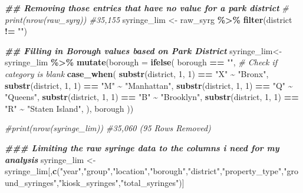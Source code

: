 \documentclass[
]{article}
\newenvironment{Shaded}{\begin{snugshade}}{\end{snugshade}}
\newcommand{\AttributeTok}[1]{\textcolor[rgb]{0.13,0.29,0.53}{#1}}
\newcommand{\CommentTok}[1]{\textcolor[rgb]{0.56,0.35,0.01}{\textit{#1}}}
\newcommand{\DecValTok}[1]{\textcolor[rgb]{0.00,0.00,0.81}{#1}}
\newcommand{\DocumentationTok}[1]{\textcolor[rgb]{0.56,0.35,0.01}{\textbf{\textit{#1}}}}
\newcommand{\FunctionTok}[1]{\textcolor[rgb]{0.13,0.29,0.53}{\textbf{#1}}}
\newcommand{\NormalTok}[1]{#1}
\newcommand{\OtherTok}[1]{\textcolor[rgb]{0.56,0.35,0.01}{#1}}
\newcommand{\SpecialCharTok}[1]{\textcolor[rgb]{0.81,0.36,0.00}{\textbf{#1}}}
\newcommand{\StringTok}[1]{\textcolor[rgb]{0.31,0.60,0.02}{#1}}
\begin{document}
\begin{Shaded}
\begin{Highlighting}[]
\DocumentationTok{\#\# Removing those entries that have no value for a park district }
\CommentTok{\# print(nrow(raw\_syrg)) \#35,155}
\NormalTok{syringe\_lim }\OtherTok{\textless{}{-}}\NormalTok{ raw\_syrg }\SpecialCharTok{\%\textgreater{}\%} \FunctionTok{filter}\NormalTok{(district }\SpecialCharTok{!=} \StringTok{""}\NormalTok{) }

\DocumentationTok{\#\# Filling in Borough values based on Park District}
\NormalTok{syringe\_lim}\OtherTok{\textless{}{-}}\NormalTok{ syringe\_lim }\SpecialCharTok{\%\textgreater{}\%}
 \FunctionTok{mutate}\NormalTok{(}\AttributeTok{borough =} \FunctionTok{ifelse}\NormalTok{(}
\NormalTok{    borough }\SpecialCharTok{==} \StringTok{""}\NormalTok{,  }\CommentTok{\# Check if \textasciigrave{}category\textasciigrave{} is blank}
    \FunctionTok{case\_when}\NormalTok{(}
      \FunctionTok{substr}\NormalTok{(district, }\DecValTok{1}\NormalTok{, }\DecValTok{1}\NormalTok{) }\SpecialCharTok{==} \StringTok{"X"} \SpecialCharTok{\textasciitilde{}} \StringTok{"Bronx"}\NormalTok{,}
      \FunctionTok{substr}\NormalTok{(district, }\DecValTok{1}\NormalTok{, }\DecValTok{1}\NormalTok{) }\SpecialCharTok{==} \StringTok{"M"} \SpecialCharTok{\textasciitilde{}} \StringTok{"Manhattan"}\NormalTok{,}
      \FunctionTok{substr}\NormalTok{(district, }\DecValTok{1}\NormalTok{, }\DecValTok{1}\NormalTok{) }\SpecialCharTok{==} \StringTok{"Q"} \SpecialCharTok{\textasciitilde{}} \StringTok{"Queens"}\NormalTok{,}
      \FunctionTok{substr}\NormalTok{(district, }\DecValTok{1}\NormalTok{, }\DecValTok{1}\NormalTok{) }\SpecialCharTok{==} \StringTok{"B"} \SpecialCharTok{\textasciitilde{}} \StringTok{"Brooklyn"}\NormalTok{,}
      \FunctionTok{substr}\NormalTok{(district, }\DecValTok{1}\NormalTok{, }\DecValTok{1}\NormalTok{) }\SpecialCharTok{==} \StringTok{"R"} \SpecialCharTok{\textasciitilde{}} \StringTok{"Staten Island"}\NormalTok{,}
\NormalTok{    ),}
\NormalTok{    borough}
\NormalTok{  ))}

\CommentTok{\#print(nrow(syringe\_lim)) \#35,060 (95 Rows Removed)}

\DocumentationTok{\#\#\# Limiting the raw syringe data to the columns i need for my analysis}
\NormalTok{syringe\_lim }\OtherTok{\textless{}{-}}\NormalTok{ syringe\_lim[,}\FunctionTok{c}\NormalTok{(}\StringTok{"year"}\NormalTok{,}\StringTok{"group"}\NormalTok{,}\StringTok{"location"}\NormalTok{,}\StringTok{"borough"}\NormalTok{,}\StringTok{"district"}\NormalTok{,}\StringTok{"property\_type"}\NormalTok{,}\StringTok{"ground\_syringes"}\NormalTok{,}\StringTok{"kiosk\_syringes"}\NormalTok{,}\StringTok{"total\_syringes"}\NormalTok{)]}
\end{Highlighting}
\end{Shaded}
\end{document}
